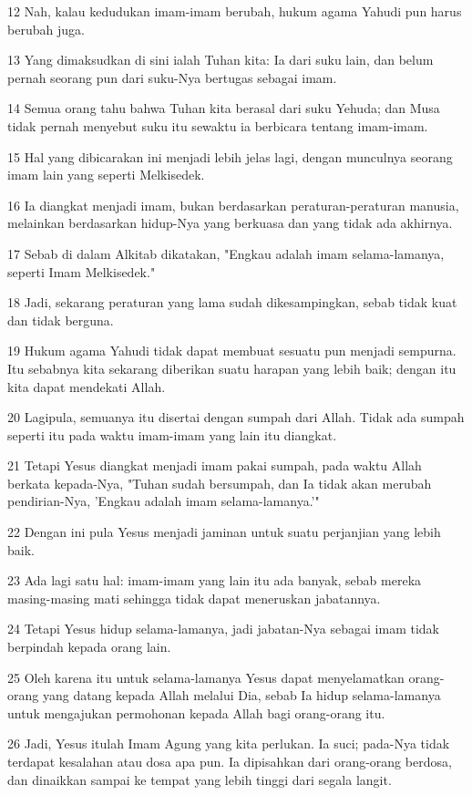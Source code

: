 \par 12 Nah, kalau kedudukan imam-imam berubah, hukum agama Yahudi pun harus berubah juga.
\par 13 Yang dimaksudkan di sini ialah Tuhan kita: Ia dari suku lain, dan belum pernah seorang pun dari suku-Nya bertugas sebagai imam.
\par 14 Semua orang tahu bahwa Tuhan kita berasal dari suku Yehuda; dan Musa tidak pernah menyebut suku itu sewaktu ia berbicara tentang imam-imam.
\par 15 Hal yang dibicarakan ini menjadi lebih jelas lagi, dengan munculnya seorang imam lain yang seperti Melkisedek.
\par 16 Ia diangkat menjadi imam, bukan berdasarkan peraturan-peraturan manusia, melainkan berdasarkan hidup-Nya yang berkuasa dan yang tidak ada akhirnya.
\par 17 Sebab di dalam Alkitab dikatakan, "Engkau adalah imam selama-lamanya, seperti Imam Melkisedek."
\par 18 Jadi, sekarang peraturan yang lama sudah dikesampingkan, sebab tidak kuat dan tidak berguna.
\par 19 Hukum agama Yahudi tidak dapat membuat sesuatu pun menjadi sempurna. Itu sebabnya kita sekarang diberikan suatu harapan yang lebih baik; dengan itu kita dapat mendekati Allah.
\par 20 Lagipula, semuanya itu disertai dengan sumpah dari Allah. Tidak ada sumpah seperti itu pada waktu imam-imam yang lain itu diangkat.
\par 21 Tetapi Yesus diangkat menjadi imam pakai sumpah, pada waktu Allah berkata kepada-Nya, "Tuhan sudah bersumpah, dan Ia tidak akan merubah pendirian-Nya, 'Engkau adalah imam selama-lamanya.'"
\par 22 Dengan ini pula Yesus menjadi jaminan untuk suatu perjanjian yang lebih baik.
\par 23 Ada lagi satu hal: imam-imam yang lain itu ada banyak, sebab mereka masing-masing mati sehingga tidak dapat meneruskan jabatannya.
\par 24 Tetapi Yesus hidup selama-lamanya, jadi jabatan-Nya sebagai imam tidak berpindah kepada orang lain.
\par 25 Oleh karena itu untuk selama-lamanya Yesus dapat menyelamatkan orang-orang yang datang kepada Allah melalui Dia, sebab Ia hidup selama-lamanya untuk mengajukan permohonan kepada Allah bagi orang-orang itu.
\par 26 Jadi, Yesus itulah Imam Agung yang kita perlukan. Ia suci; pada-Nya tidak terdapat kesalahan atau dosa apa pun. Ia dipisahkan dari orang-orang berdosa, dan dinaikkan sampai ke tempat yang lebih tinggi dari segala langit.
